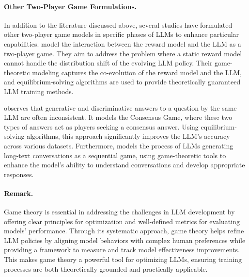 \paragraph{Other Two-Player Game Formulations.}
In addition to the literature discussed above, several studies have formulated other two-player game models in specific phases of LLMs to enhance particular capabilities.
\cite{chakraborty2024parl,STARLHF,cheng2024adversarial} model the interaction between the reward model and the LLM as a two-player game. They aim to address the problem where a static reward model cannot handle the distribution shift of the evolving LLM policy. Their game-theoretic modeling captures the co-evolution of the reward model and the LLM, and equilibrium-solving algorithms are used to provide theoretically guaranteed LLM training methods. 

\cite{jacob2023consensus} observes that generative and discriminative answers to a question by the same LLM are often inconsistent. It models the Consensus Game, where these two types of answers act as players seeking a consensus answer. Using equilibrium-solving algorithms, this approach significantly improves the LLM's accuracy across various datasets. Furthermore, \cite{gemp2024states} models the process of LLMs generating long-text conversations as a sequential game, using game-theoretic tools to enhance the model's ability to understand conversations and develop appropriate responses.

\paragraph{Remark.}
Game theory is essential in addressing the challenges in LLM development by offering clear principles for optimization and well-defined metrics for evaluating models' performance. Through its systematic approach, game theory helps refine LLM policies by aligning model behaviors with complex human preferences while providing a framework to measure and track model effectiveness improvements. This makes game theory a powerful tool for optimizing LLMs, ensuring training processes are both theoretically grounded and practically applicable.



